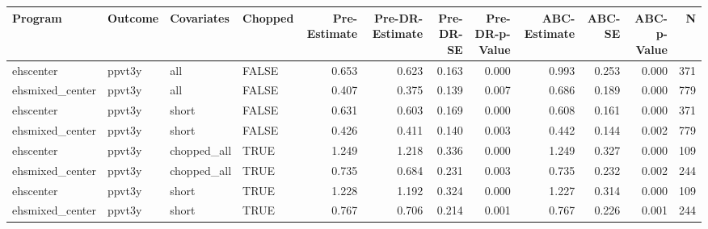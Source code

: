 \begin{table}[ht]
\centering
\begin{tabular}{llllrrrrrrrr}
  \hline
Program & Outcome & Covariates & Chopped & Pre-Estimate & Pre-DR-Estimate & Pre-DR-SE & Pre-DR-p-Value & ABC-Estimate & ABC-SE & ABC-p-Value & N \\ 
  \hline
ehscenter & ppvt3y & all & FALSE & 0.653 & 0.623 & 0.163 & 0.000 & 0.993 & 0.253 & 0.000 & 371 \\ 
  ehsmixed\_center & ppvt3y & all & FALSE & 0.407 & 0.375 & 0.139 & 0.007 & 0.686 & 0.189 & 0.000 & 779 \\ 
  ehscenter & ppvt3y & short & FALSE & 0.631 & 0.603 & 0.169 & 0.000 & 0.608 & 0.161 & 0.000 & 371 \\ 
  ehsmixed\_center & ppvt3y & short & FALSE & 0.426 & 0.411 & 0.140 & 0.003 & 0.442 & 0.144 & 0.002 & 779 \\ 
  ehscenter & ppvt3y & chopped\_all & TRUE & 1.249 & 1.218 & 0.336 & 0.000 & 1.249 & 0.327 & 0.000 & 109 \\ 
  ehsmixed\_center & ppvt3y & chopped\_all & TRUE & 0.735 & 0.684 & 0.231 & 0.003 & 0.735 & 0.232 & 0.002 & 244 \\ 
  ehscenter & ppvt3y & short & TRUE & 1.228 & 1.192 & 0.324 & 0.000 & 1.227 & 0.314 & 0.000 & 109 \\ 
  ehsmixed\_center & ppvt3y & short & TRUE & 0.767 & 0.706 & 0.214 & 0.001 & 0.767 & 0.226 & 0.001 & 244 \\ 
   \hline
\end{tabular}
\end{table}
